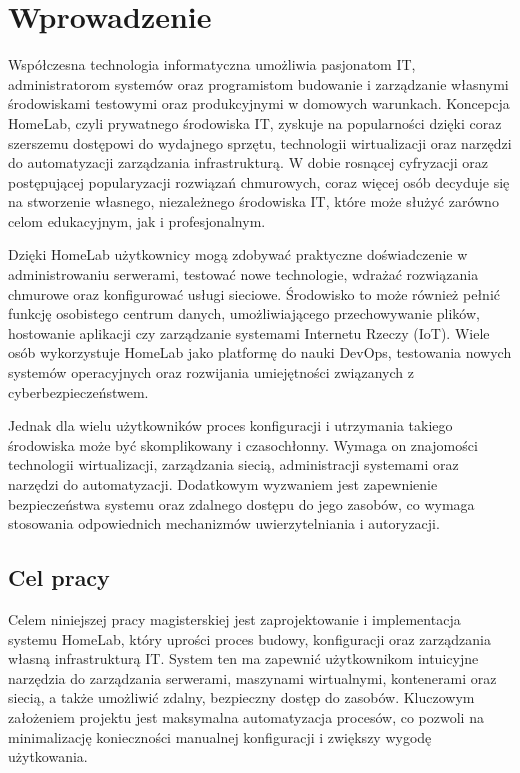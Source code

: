 \chapter{Wprowadzenie}

Współczesna technologia informatyczna umożliwia pasjonatom IT, administratorom systemów oraz programistom budowanie i zarządzanie własnymi środowiskami testowymi oraz produkcyjnymi w domowych warunkach. Koncepcja HomeLab, czyli prywatnego środowiska IT, zyskuje na popularności dzięki coraz szerszemu dostępowi do wydajnego sprzętu, technologii wirtualizacji oraz narzędzi do automatyzacji zarządzania infrastrukturą. W dobie rosnącej cyfryzacji oraz postępującej popularyzacji rozwiązań chmurowych, coraz więcej osób decyduje się na stworzenie własnego, niezależnego środowiska IT, które może służyć zarówno celom edukacyjnym, jak i profesjonalnym.

Dzięki HomeLab użytkownicy mogą zdobywać praktyczne doświadczenie w administrowaniu serwerami, testować nowe technologie, wdrażać rozwiązania chmurowe oraz konfigurować usługi sieciowe. Środowisko to może również pełnić funkcję osobistego centrum danych, umożliwiającego przechowywanie plików, hostowanie aplikacji czy zarządzanie systemami Internetu Rzeczy (IoT). Wiele osób wykorzystuje HomeLab jako platformę do nauki DevOps, testowania nowych systemów operacyjnych oraz rozwijania umiejętności związanych z cyberbezpieczeństwem.

Jednak dla wielu użytkowników proces konfiguracji i utrzymania takiego środowiska może być skomplikowany i czasochłonny. Wymaga on znajomości technologii wirtualizacji, zarządzania siecią, administracji systemami oraz narzędzi do automatyzacji. Dodatkowym wyzwaniem jest zapewnienie bezpieczeństwa systemu oraz zdalnego dostępu do jego zasobów, co wymaga stosowania odpowiednich mechanizmów uwierzytelniania i autoryzacji.

\section{Cel pracy}

Celem niniejszej pracy magisterskiej jest zaprojektowanie i implementacja systemu HomeLab, który uprości proces budowy, konfiguracji oraz zarządzania własną infrastrukturą IT. System ten ma zapewnić użytkownikom intuicyjne narzędzia do zarządzania serwerami, maszynami wirtualnymi, kontenerami oraz siecią, a także umożliwić zdalny, bezpieczny dostęp do zasobów. Kluczowym założeniem projektu jest maksymalna automatyzacja procesów, co pozwoli na minimalizację konieczności manualnej konfiguracji i zwiększy wygodę użytkowania.


